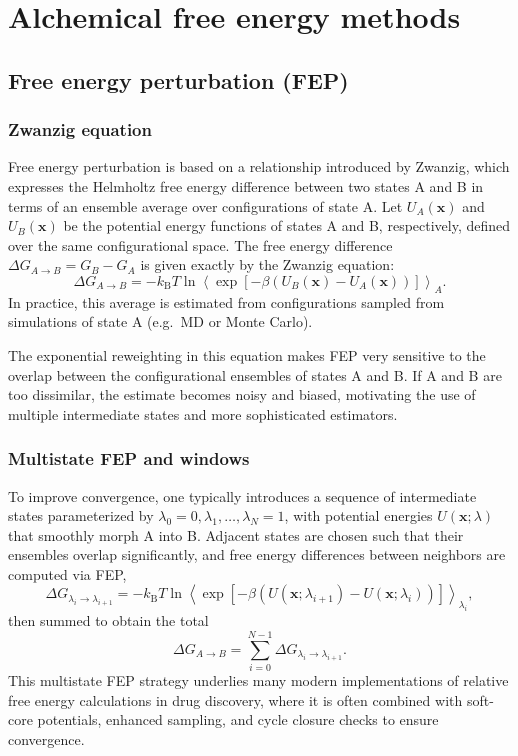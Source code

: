 \documentclass[12pt]{article}
\begin{document}
\section{Alchemical free energy methods}

\subsection{Free energy perturbation (FEP)}

\subsubsection{Zwanzig equation}

Free energy perturbation is based on a relationship introduced by Zwanzig, which expresses the Helmholtz free energy difference between two states A and B in terms of an ensemble average over configurations of state A.\cite{CH10_zwanzig1954high} 
Let \(U_A(\mathbf{x})\) and \(U_B(\mathbf{x})\) be the potential energy functions of states A and B, respectively, defined over the same configurational space. 
The free energy difference \(\Delta G_{A\to B} = G_B - G_A\) is given exactly by the Zwanzig equation:
\[
\Delta G_{A\to B} 
= -k_\mathrm{B}T \ln 
\left\langle 
\exp\left[ -\beta \left( U_B(\mathbf{x}) - U_A(\mathbf{x}) \right) \right]
\right\rangle_A.
\]
In practice, this average is estimated from configurations sampled from simulations of state A (e.g.\ MD or Monte Carlo). 

The exponential reweighting in this equation makes FEP very sensitive to the overlap between the configurational ensembles of states A and B. 
If A and B are too dissimilar, the estimate becomes noisy and biased, motivating the use of multiple intermediate states and more sophisticated estimators. 

\subsubsection{Multistate FEP and windows}

To improve convergence, one typically introduces a sequence of intermediate states parameterized by \(\lambda_0=0,\lambda_1,\ldots,\lambda_N=1\), with potential energies \(U(\mathbf{x};\lambda)\) that smoothly morph A into B. 
Adjacent states are chosen such that their ensembles overlap significantly, and free energy differences between neighbors are computed via FEP,
\[
\Delta G_{\lambda_i \to \lambda_{i+1}} 
= -k_\mathrm{B}T \ln 
\left\langle 
\exp\left[ -\beta \left( U(\mathbf{x};\lambda_{i+1}) - U(\mathbf{x};\lambda_i) \right) \right]
\right\rangle_{\lambda_i},
\]
then summed to obtain the total
\[
\Delta G_{A\to B} = \sum_{i=0}^{N-1} \Delta G_{\lambda_i \to \lambda_{i+1}}.
\]
This multistate FEP strategy underlies many modern implementations of relative free energy calculations in drug discovery, where it is often combined with soft-core potentials, enhanced sampling, and cycle closure checks to ensure convergence.\cite{CH10_aldeghi2018accurate,CH10_wang2015accurate} 
\end{document}
